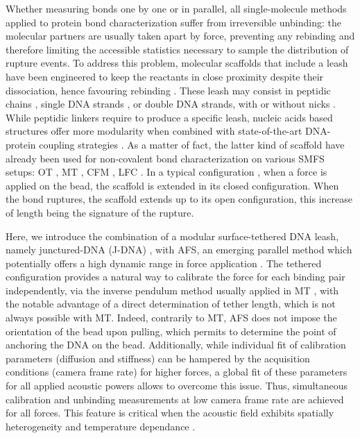 \documentclass{biophys-new}
\begin{document}
Whether measuring bonds one by one or in parallel, all single-molecule methods applied to protein bond characterization suffer from irreversible unbinding: the molecular partners are usually taken apart by force, preventing any rebinding and therefore limiting the accessible statistics necessary to sample the distribution of rupture events. To address this problem, molecular scaffolds that include a leash have been engineered to keep the reactants in close proximity despite their dissociation, hence favouring rebinding \cite{kim2010, halvorsen2010, gosse2019}. These leash may consist in peptidic chains \cite{kim2010, gao2012, rognoni2012, wang2019, bauer2022}, single DNA strands \cite{mickolajczyk2022, shrestha2021, kilchherr2016}, or double DNA strands, with \cite{yang2016, halvorsen2011, penth2021} or without nicks \cite{li2019, kostrz2019, ma2019}. While peptidic linkers require to produce a specific leash, nucleic acids based structures offer more modularity when combined with state-of-the-art DNA-protein coupling strategies \cite{gosse2019, kostrz2019, maciuba2021, mukhortava2016, synakewicz2019, vandersleen2021, koussa2014, madsen2019}. As a matter of fact, the latter kind of scaffold have already been used for non-covalent bond characterization on various SMFS setups: OT \cite{mickolajczyk2022, kilchherr2016, shrestha2021,yang2016,halvorsen2010}, MT \cite{kostrz2019, shrestha2021, li2019,ma2019}, CFM \cite{yang2016}, LFC \cite{penth2021}. In a typical configuration \cite{kostrz2019}, when a force is applied on the bead, the scaffold is extended in its closed configuration. When the bond ruptures, the scaffold extends up to its open configuration, this increase of length being the signature of the rupture.

Here, we introduce the combination of a modular surface-tethered DNA leash, namely junctured-DNA (J-DNA) \cite{kostrz2019}, with AFS, an emerging parallel method which potentially offers a high dynamic range in force application \cite{sitters2015, kamsma2016}. The tethered configuration provides a natural way to calibrate the force for each binding pair independently, via the inverse pendulum method usually applied in MT \cite{strick1996,gosse2002}, with the notable advantage of a direct determination of tether length, which is not always possible with MT. Indeed, contrarily to MT, AFS does not impose the orientation of the bead upon pulling, which permits to determine the point of anchoring the DNA on the bead. Additionally, while individual fit of calibration parameters (diffusion and stiffness) can be hampered by the acquisition conditions (camera frame rate) for higher forces, a global fit of these parameters for all applied acoustic powers allows to overcome this issue. Thus, simultaneous calibration and unbinding measurements at low camera frame rate are achieved for all forces. This feature is critical when the acoustic field exhibits spatially heterogeneity and temperature dependance \cite{kamsma2016, nguyen2021}. %
\end{document}
